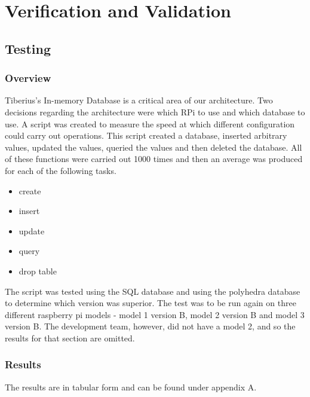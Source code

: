 \section{Verification and Validation}

\subsection{Testing}
\subsubsection{Overview}
Tiberius's In-memory Database is a critical area of our architecture. Two decisions regarding the architecture were which RPi to use and which database to use. A script was created to measure the speed at which different configuration could carry out operations. This script created a database, inserted arbitrary values, updated the values, queried the values and then deleted the database. All of these functions were carried out 1000 times and then an average was produced for each of the following tasks.
\begin{itemize}
\item create
\item insert
\item update
\item query
\item drop table
\end{itemize}
The script was tested using the SQL database and using the polyhedra database to determine which version was superior. The test was to be run again on three different raspberry pi models - model 1 version B, model 2 version B and model 3 version B. The development team, however, did not have a model 2, and so the results for that section are omitted. 

\subsubsection{Results}
The results are in tabular form and can be found under appendix A.

